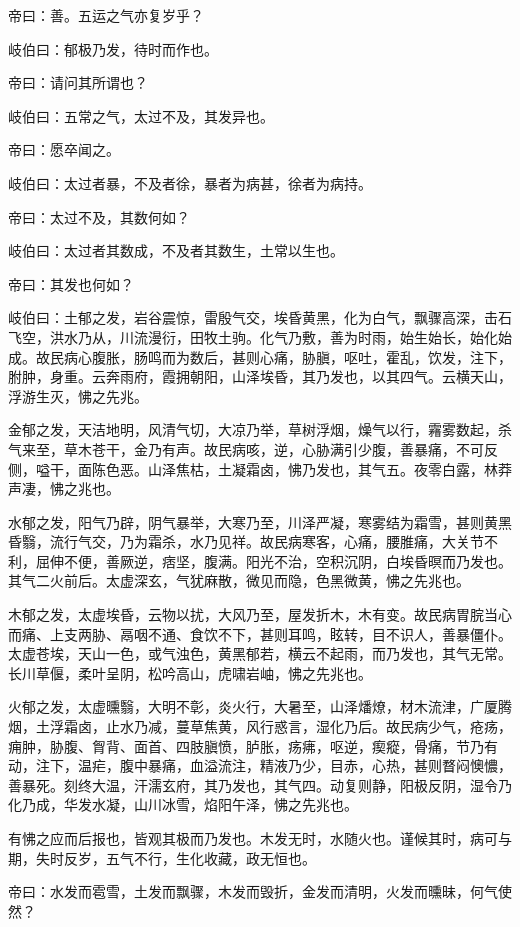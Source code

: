 \documentclass{article}%
\begin{document}
帝曰：善。五运之气亦复岁乎？

岐伯曰：郁极乃发，待时而作也。

帝曰：请问其所谓也？

岐伯曰：五常之气，太过不及，其发异也。

帝曰：愿卒闻之。

岐伯曰：太过者暴，不及者徐，暴者为病甚，徐者为病持。

帝曰：太过不及，其数何如？

岐伯曰：太过者其数成，不及者其数生，土常以生也。

帝曰：其发也何如？

岐伯曰：土郁之发，岩谷震惊，雷殷气交，埃昏黄黑，化为白气，飘骤高深，击石飞空，洪水乃从，川流漫衍，田牧土驹。化气乃敷，善为时雨，始生始长，始化始成。故民病心腹胀，肠鸣而为数后，甚则心痛，胁䐜，呕吐，霍乱，饮发，注下，胕肿，身重。云奔雨府，霞拥朝阳，山泽埃昏，其乃发也，以其四气。云横天山，浮游生灭，怫之先兆。

金郁之发，天洁地明，风清气切，大凉乃举，草树浮烟，燥气以行，霿雾数起，杀气来至，草木苍干，金乃有声。故民病咳，逆，心胁满引少腹，善暴痛，不可反侧，嗌干，面陈色恶。山泽焦枯，土凝霜卤，怫乃发也，其气五。夜零白露，林莽声凄，怫之兆也。

水郁之发，阳气乃辟，阴气暴举，大寒乃至，川泽严凝，寒雾结为霜雪，甚则黄黑昏翳，流行气交，乃为霜杀，水乃见祥。故民病寒客，心痛，腰脽痛，大关节不利，屈伸不便，善厥逆，痞坚，腹满。阳光不治，空积沉阴，白埃昏暝而乃发也。其气二火前后。太虚深玄，气犹麻散，微见而隐，色黑微黄，怫之先兆也。

木郁之发，太虚埃昏，云物以扰，大风乃至，屋发折木，木有变。故民病胃脘当心而痛、上支两胁、鬲咽不通、食饮不下，甚则耳鸣，眩转，目不识人，善暴僵仆。太虚苍埃，天山一色，或气浊色，黄黑郁若，横云不起雨，而乃发也，其气无常。长川草偃，柔叶呈阴，松吟高山，虎啸岩岫，怫之先兆也。

火郁之发，太虚曛翳，大明不彰，炎火行，大暑至，山泽燔燎，材木流津，广厦腾烟，土浮霜卤，止水乃减，蔓草焦黄，风行惑言，湿化乃后。故民病少气，疮疡，痈肿，胁腹、胷背、面首、四肢䐜愤，胪胀，疡疿，呕逆，瘈瘲，骨痛，节乃有动，注下，温疟，腹中暴痛，血溢流注，精液乃少，目赤，心热，甚则瞀闷懊憹，善暴死。刻终大温，汗濡玄府，其乃发也，其气四。动复则静，阳极反阴，湿令乃化乃成，华发水凝，山川冰雪，焰阳午泽，怫之先兆也。

有怫之应而后报也，皆观其极而乃发也。木发无时，水随火也。谨候其时，病可与期，失时反岁，五气不行，生化收藏，政无恒也。

帝曰：水发而雹雪，土发而飘骤，木发而毁折，金发而清明，火发而曛昧，何气使然？
\end{document}
